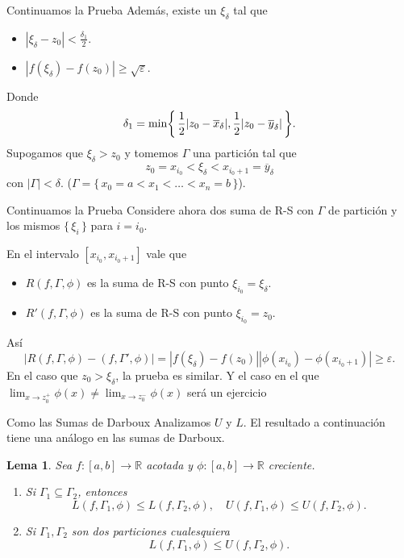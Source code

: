 \documentclass[utf8]{beamer}
\theoremstyle{plain}
\newtheorem{Lem}{Lema}                 %
\theoremstyle{definition}
\theoremstyle{remark}
\numberwithin{equation}{section}
\newcommand{\dl}{\delta}                %
\newcommand{\eps}{\varepsilon}          %
\newcommand{\Ga}{\Gamma}                %
\newcommand{\bR}{\mathbb{R}}    %
\newcommand{\set}[1]{\{\,#1\,\}}    %
\newcommand{\Set}[1]{\biggl\{\,#1\,\biggr\}} %
\renewcommand{\geq}{\geqslant}          %
\renewcommand{\leq}{\leqslant}          %
\newcommand{\ov}{\overline}
\newcommand{\half}{{\mathchoice{\nhalf}{\thalf}{\shalf}{\shalf}}} %
\newcommand{\nhalf}{\frac{1}{2}}
\newcommand{\shalf}{{\scriptstyle\frac{1}{2}}} %
\newcommand{\thalf}{{\tfrac{1}{2}}} %
\renewcommand{\.}{\Cdot}                %
\begin{document}
\begin{frame}{Continuamos la Prueba}
  Además, existe un $\xi_\dl$ tal que 
  \begin{itemize}
    \item $|\xi_\dl-z_0|<\frac{\dl_1}{2}$.
    \item $|f(\xi_\dl)-f(z_0)|\geq\sqrt{\eps}$.
  \end{itemize}
  Donde 
  $$\dl_1=\min\Set{\half|z_0-\ov x_\dl|,\half|z_0-\ov y_\dl|}.$$
  Supogamos que $\xi_\dl>z_0$ y tomemos $\Ga$ una partición tal que 
  $$z_0=x_{i_0}<\xi_\dl<x_{i_0+1}=\ov y_\dl$$
  con $|\Ga|<\dl$. ($\Ga=\set{x_0=a<x_1<\dots<x_n=b}$).
\end{frame}

\begin{frame}{Continuamos la Prueba}
Considere ahora dos suma de R-S con $\Ga$ de partición y los mismos $\set{\xi_i}$ para $i=i_0$.\par 
En el intervalo $[x_{i_0},x_{i_0+1}]$ vale que
 \begin{itemize}
  \item $R(f,\Ga,\phi)$ es la suma de R-S con punto $\xi_{i_0}=\xi_\dl$.
  \item $R'(f,\Ga,\phi)$ es la suma de R-S con punto $\xi_{i_0}=z_0$.
\end{itemize}
Así 
$$|R(f,\Ga,\phi)-(f,\Ga',\phi)|=|f(\xi_\dl)-f(z_0)||\phi(x_{i_0})-\phi(x_{i_0+1})|\geq\eps.$$
En el caso que $z_0>\xi_\dl$, la prueba es similar. Y el caso en el que $\lim_{x\to z_0^+}\phi(x)\neq\lim_{x\to z_0^-}\phi(x)$ será un \alert{ejercicio}
 \end{frame}

 \begin{frame}{Como las Sumas de Darboux}
   Analizamos $U$ y $L$. El resultado a continuación tiene una análogo en las sumas de Darboux.
   \begin{Lem}\label{lem:PropsSumasInfSup}
     Sea $f:[a,b]\to\bR$ acotada y $\phi:[a,b]\to\bR$ creciente.
     \begin{enumerate}
       \item Si $\Ga_1\subseteq\Ga_2$, entonces 
       $$L(f,\Ga_1,\phi)\leq L(f,\Ga_2,\phi),\quad U(f,\Ga_1,\phi)\leq U(f,\Ga_2,\phi).$$
       \item Si $\Ga_1,\Ga_2$ son dos particiones cualesquiera 
       $$L(f,\Ga_1,\phi)\leq U(f,\Ga_2,\phi).$$
     \end{enumerate}
   \end{Lem}
 \end{frame}
\end{document}
